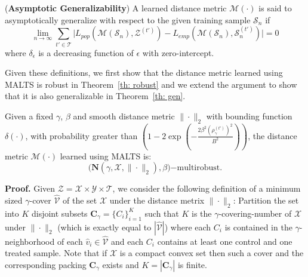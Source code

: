 \begin{define}
(\textbf{Asymptotic Generalizability}) 
A learned distance metric $\mathcal{M}(\cdot)$ is said to asymptotically generalize with respect to the given training sample $\mathcal{S}_n$ if 
$$ \lim_{n\to\infty}\sum_{t'\in\mathcal{T}}\Big| L_{pop}(\mathcal{M}(\mathcal{S}_n),\mathcal{Z}^{(t')}) - L_{emp}(\mathcal{M}(\mathcal{S}_n),\mathcal{S}^{(t')}_n) \Big| = 0$$
where $\delta_\epsilon$ is a decreasing function of $\epsilon$ with zero-intercept.
\end{define}

Given these definitions, we first show that the distance metric learned using \textsc{MALTS} is robust in Theorem~\ref{th: robust} and we extend the argument to show that it is also generalizable in Theorem~\ref{th: gen}. 

\begin{theorem}
\label{th: robust}
Given a fixed $\gamma$, $\beta$ and smooth distance metric $\|\cdot\|_2$ with bounding function $\delta(\cdot)$, with probability greater than $\left(1 - 2\exp\left(-\frac{2\beta^2(\rho^{(t')}_\gamma)^2}{B^2}\right)\right)$, the distance metric $\mathcal{M}(\cdot)$ learned using \textsc{MALTS} is: $${\Bigg(\mathbf{N}(\gamma,\mathcal{X},\|\cdot\|_2),\beta\Bigg)\mathrm{-multirobust}}.$$
\end{theorem}
\textbf{Proof. } Given $\mathcal{Z}=\mathcal{X}\times\mathcal{Y}\times\mathcal{T}$, we consider the following definition of a minimum sized $\gamma$-cover $\hat{\mathcal{V}}$ of the set $\mathcal{X}$ under the distance metrix $\|\cdot\|_2$: Partition the set into $K$ disjoint subsets $\textbf{C}_\gamma = \{C_i\}_{i=1}^{K}$ such that $K$ is the $\gamma$-covering-number of $\mathcal{X}$ under $\|\cdot\|_2$ (which is exactly equal to $|\hat{\mathcal{V}}|$) where each $C_i$ is contained in the $\gamma$-neighborhood of each $\hat{v}_i\in\hat{\mathcal{V}}$ and each $C_i$ contains at least one control and one treated sample. Note that if $\mathcal{X}$ is a compact convex set then such a cover and the corresponding packing $\textbf{C}_\gamma$ exists and $K=|\textbf{C}_\gamma|$ is finite. 

